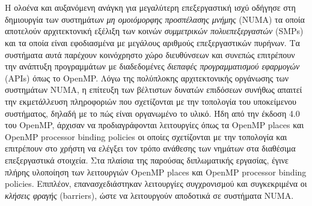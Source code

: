 \chapter*{\abstractname}
\addstarredchapter{\abstractname} %
\makecseabstract


\noindent Η ολοένα και αυξανόμενη ανάγκη για μεγαλύτερη επεξεργαστική ισχύ οδήγησε στη δημιουργία των συστημάτων \textit{μη ομοιόμορφης προσπέλασης μνήμης} (NUMA) τα οποία αποτελούν αρχιτεκτονική εξέλιξη των κοινών \textit{συμμετρικών πολυεπεξεργαστών} (SMPs) και τα οποία είναι εφοδιασμένα με μεγάλους αριθμούς επεξεργαστικών πυρήνων. Τα συστήματα αυτά παρέχουν κοινόχρηστο χώρο διευθύνσεων και συνεπώς επιτρέπουν την ανάπτυξη προγραμμάτων με διαδεδομένες \textit{διεπαφές προγραμματισμού εφαρμογών} (APIs) όπως το OpenMP. Λόγω της πολύπλοκης αρχιτεκτονικής οργάνωσης των συστημάτων NUMA, η επίτευξη των βέλτιστων δυνατών επιδόσεων συνήθως απαιτεί την εκμετάλλευση πληροφοριών που σχετίζονται με την τοπολογία του υποκείμενου συστήματος, δηλαδή με το πώς είναι οργανωμένο το υλικό. Ήδη από την έκδοση 4.0 του OpenMP, άρχισαν να προδιαγράφονται λειτουργίες όπως τα OpenMP places και OpenMP processor binding policies οι οποίες σχετίζονται με την τοπολογία και επιτρέπουν στο χρήστη να ελέγξει τον τρόπο ανάθεσης των νημάτων στα διαθέσιμα επεξεργαστικά στοιχεία. Στα πλαίσια της παρούσας διπλωματικής εργασίας, έγινε πλήρης υλοποίηση των λειτουργιών OpenMP places και OpenMP processor binding policies. Επιπλέον, επανασχεδιάστηκαν λειτουργίες συγχρονισμού και συγκεκριμένα οι \textit{κλήσεις φραγής} (barriers), ώστε να λειτουργούν αποδοτικά σε συστήματα NUMA.


\bigskip